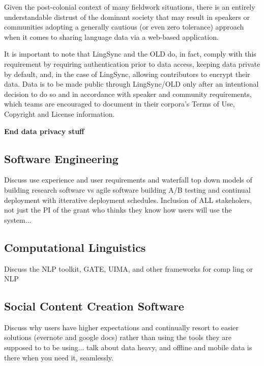 \documentclass[11pt]{article}
\begin{document}
Given the post-colonial context of many fieldwork situations, there
is an entirely understandable distrust of the dominant society that may result
in speakers or communities adopting a generally cautious (or even zero
tolerance) approach when it comes to sharing language data via a web-based
application.

It is important to note that LingSync and the OLD do, in fact, comply with this
requirement by requiring authentication prior to data access, keeping data
private by default, and, in the case of LingSync, allowing contributors to
encrypt their data. Data is to be made public through LingSync/OLD only after
an intentional decision to do so and in accordance with speaker and community
requirements, which teams are encouraged to document in their corpora's Terms of
Use, Copyright and License information.


\textbf{End data privacy stuff}









\subsection{Software Engineering}

Discuss use experience and user requirements and waterfall top down models of building research software vs agile software building A/B testing and continual deployment with itterative deployment schedules.  Inclusion of ALL stakeholers, not just the PI of the grant who thinks they know how users will use the system...

\subsection{Computational Linguistics}


Discuss the NLP toolkit, GATE, UIMA, and other frameworks for comp ling or NLP

\subsection{Social Content Creation Software}


Discuss why users have higher expectations and continually resort to easier solutions (evernote and google docs) rather than using the tools they are supposed to to be using... talk about data heavy, and offline and mobile data is there when you need it, seamlessly. 
\end{document}
